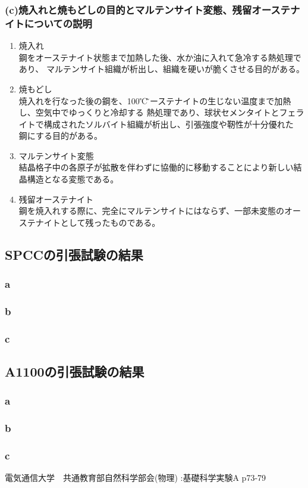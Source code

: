 \documentclass[10pt,a4j]{jsarticle}
\begin{document}
    \subsubsection{(c)焼入れと焼もどしの目的とマルテンサイト変態、残留オーステナイトについての説明}
      \begin{enumerate}
        \item 焼入れ \\
          鋼をオーステナイト状態まで加熱した後、水か油に入れて急冷する熱処理であり、
          マルテンサイト組織が析出し、組織を硬いが脆くさせる目的がある。
        \item 焼もどし \\
          焼入れを行なった後の鋼を、100℃\~オーステナイトの生じない温度まで加熱し、空気中でゆっくりと冷却する
          熱処理であり、球状セメンタイトとフェライトで構成されたソルバイト組織が析出し、引張強度や靭性が十分優れた
          鋼にする目的がある。
        \item マルテンサイト変態 \\
          結晶格子中の各原子が拡散を伴わずに協働的に移動することにより新しい結晶構造となる変態である。
        \item 残留オーステナイト \\
          鋼を焼入れする際に、完全にマルテンサイトにはならず、一部未変態のオーステナイトとして残ったものである。
      \end{enumerate}  

  \subsection{SPCCの引張試験の結果}
    \subsubsection{a}
    \subsubsection{b}
    \subsubsection{c}
  \subsection{A1100の引張試験の結果}
    \subsubsection{a}
    \subsubsection{b}
    \subsubsection{c}
\begin{thebibliography}{3}
\bibitem{}電気通信大学　共通教育部自然科学部会(物理) :基礎科学実験A p73-79
\end{thebibliography}
\end{document}
